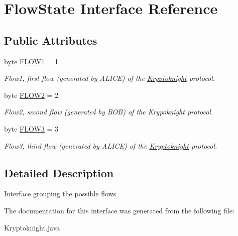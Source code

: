 \hypertarget{interface_flow_state}{
\section{Flow\-State Interface Reference}
\label{interface_flow_state}
}
\subsection*{Public Attributes}
\begin{CompactItemize}
\item 
\hypertarget{interface_flow_state_o0}{
byte \hyperlink{interface_flow_state_o0}{FLOW1} = 1}
\label{interface_flow_state_o0}

\begin{CompactList}\small\item\em Flow1, first flow (generated by ALICE) of the \hyperlink{class_kryptoknight}{Kryptoknight} protocol. \item\end{CompactList}\item 
\hypertarget{interface_flow_state_o1}{
byte \hyperlink{interface_flow_state_o1}{FLOW2} = 2}
\label{interface_flow_state_o1}

\begin{CompactList}\small\item\em Flow2, second flow (generated by BOB) of the Krypoknight protocol. \item\end{CompactList}\item 
\hypertarget{interface_flow_state_o2}{
byte \hyperlink{interface_flow_state_o2}{FLOW3} = 3}
\label{interface_flow_state_o2}

\begin{CompactList}\small\item\em Flow3, third flow (generated by ALICE) of the \hyperlink{class_kryptoknight}{Kryptoknight} protocol. \item\end{CompactList}\end{CompactItemize}


\subsection{Detailed Description}
Interface grouping the possible flows 



The documentation for this interface was generated from the following file:\begin{CompactItemize}
\item 
Kryptoknight.java\end{CompactItemize}
